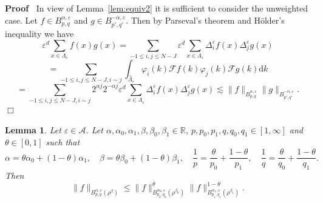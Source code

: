\documentclass[a4paper,11pt]{article}
\newcommand{\mathd}{\mathrm{d}}
\newenvironment{proof}{\noindent\textbf{Proof\ }}{\hspace*{\fill}$\Box$\medskip}
\newtheorem{lemma}[theorem]{Lemma}
\numberwithin{equation}{section}
\begin{document}
\begin{proof}
  In view of Lemma~\ref{lem:equiv2} it is sufficient to consider the
  unweighted case. Let $f \in B^{\alpha, \varepsilon}_{p, q}$ and $g \in B^{-
  \alpha, \varepsilon}_{p', q'}$. Then by Parseval's theorem and H{\"o}lder's
  inequality we have
  \[ \varepsilon^d \sum_{x \in \Lambda_{\varepsilon}} f (x) g (x) = \sum_{- 1
     \leqslant i, j \leqslant N - J} \varepsilon^d \sum_{x \in
     \Lambda_{\varepsilon}} \Delta_i^{\varepsilon} f (x)
     \Delta_j^{\varepsilon} g (x) \]
  \[ = \sum_{- 1 \leqslant i, j \leqslant N - J, i \sim j}
     \int_{\hat{\Lambda}_{\varepsilon}} \varphi_i (k) \mathcal{F} f (k)
     \varphi_j (k) \mathcal{F} g (k) \mathd k \]
  \[ = \sum_{- 1 \leqslant i, j \leqslant N - J, i \sim j} 2^{\alpha j} 2^{-
     \alpha j} \varepsilon^d \sum_{x \in \Lambda_{\varepsilon}}
     \Delta_i^{\varepsilon} f (x) \Delta_j^{\varepsilon} g (x) \lesssim \| f
     \|_{B_{p, q}^{\alpha, \varepsilon}} \| g \|_{B_{p', q'}^{- \alpha,
     \varepsilon}} . \]
\end{proof}

\begin{lemma}
  \label{lem:int}Let $\varepsilon \in \mathcal{A}$. Let $\alpha, \alpha_0,
  \alpha_1, \beta, \beta_0, \beta_1 \in \mathbb{R}$, $p, p_0, p_1, q, q_0, q_1
  \in [1, \infty]$ and $\theta \in [0, 1]$ such that
  \[ \alpha = \theta \alpha_0 + (1 - \theta) \alpha_1, \quad \beta = \theta
     \beta_0 + (1 - \theta) \beta_1, \quad \frac{1}{p} = \frac{\theta}{p_0} +
     \frac{1 - \theta}{p_1}, \quad \frac{1}{q} = \frac{\theta}{q_0} + \frac{1
     - \theta}{q_1} . \]
  Then
  \[ \| f \|_{B^{\alpha, \varepsilon}_{p, q} (\rho^{\beta})} \leqslant \| f
     \|^{\theta}_{B^{\alpha_0, \varepsilon}_{p_0, q_0} (\rho^{\beta_0})} \| f
     \|^{1 - \theta}_{B^{\alpha_1, \varepsilon}_{p_1, q_1} (\rho^{\beta_1})} .
  \]
\end{lemma}
\end{document}
